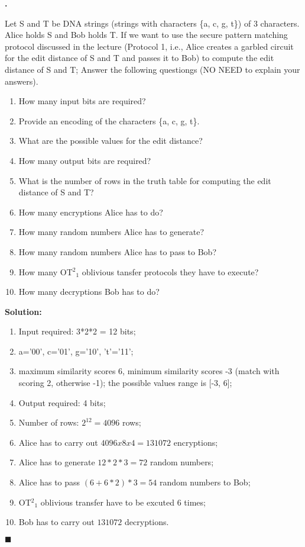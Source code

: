 \documentclass{article}
\newcounter{pcounter}                                   %
\newenvironment{problem}                                %
{                                                       %
    \color{gray}                                        %
    \stepcounter{pcounter}                              %
    \textbf{\arabic{pcounter}.}                         %
}{}                                                     %
\newenvironment{solution}                               %
{\textbf{Solution:} \\}{$\blacksquare$\newline}         %
\begin{document}
    \begin{problem}
        Let S and T be DNA strings (strings with characters \{a, c, g, t\}) of 3 characters.
        Alice holds S and Bob holds T. If we want to use the secure pattern matching protocol discussed in the lecture (Protocol 1, i.e., Alice creates a garbled circuit for the edit distance of S and T and passes it to Bob) to compute the edit distance of S and T;
        Answer the following questiongs (NO NEED to explain your answers).
        \\
        \begin{enumerate}[label=(\alph*)]
            \item How many input bits are required?
            \item Provide an encoding of the characters \{a, c, g, t\}.
            \item What are the possible values for the edit distance?
            \item How many output bits are required?
            \item What is the number of rows in the truth table for computing the edit distance of S and T?
            \item How many encryptions Alice has to do?
            \item How many random numbers Alice has to generate?
            \item How many random numbers Alice has to pass to Bob?
            \item How many OT${^2}_1$ oblivious tansfer protocols they have to execute?
            \item How many decryptions Bob has to do?
        \end{enumerate}
    \end{problem}

    \begin{solution}
        \begin{enumerate}[label=(\alph*)]
            \item Input required: 3*2*2 = 12 bits;
            \item a='00', c='01', g='10', 't'='11';
            \item maximum similarity scores 6, minimum similarity scores -3 (match with scoring 2, otherwise -1); the possible values range is [-3, 6];
            \item Output required: 4 bits;
            \item Number of rows: $2^{12} = 4096$ rows;
            \item Alice has to carry out $4096x8x4=131072$ encryptions;
            \item Alice has to generate $12*2*3=72$ random numbers;
            \item Alice has to pass $(6+6*2)*3=54$ random numbers to Bob;
            \item OT${^2}_1$ oblivious transfer have to be excuted $6$ times;
            \item Bob has to carry out $131072$ decryptions.
        \end{enumerate}
    \end{solution}
\end{document}
